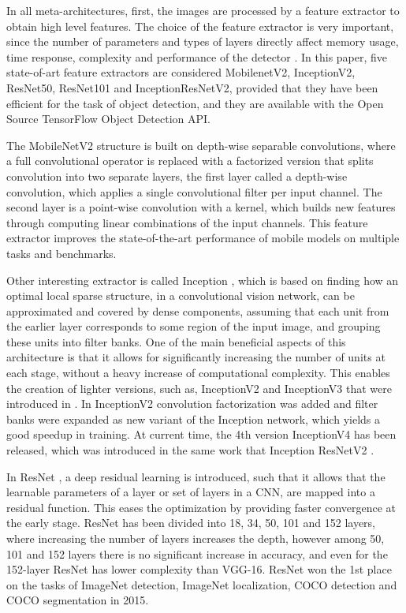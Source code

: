 \documentclass[journal]{IEEEtran}
\begin{document}
In all meta-architectures, first, the images are processed by a feature extractor to obtain high level features. The choice of the feature extractor is very important, since the number of parameters and types of layers directly affect memory usage, time response, complexity and performance of the detector \cite{huang2017speed}. In this paper, five state-of-art feature extractors are considered MobilenetV2, InceptionV2, ResNet50, ResNet101 and InceptionResNetV2, provided that they have been efficient for the task of object detection, and they are available with the Open Source TensorFlow Object Detection API. 

The MobileNetV2 \cite{sandler2018mobilenetv2} structure is built on depth-wise separable convolutions, where a full convolutional operator is replaced with a factorized version that splits convolution into two separate layers, the first layer called a depth-wise convolution, which applies a single convolutional filter per input channel. The second layer is a point-wise convolution with a  kernel, which builds new features through computing linear combinations of the input channels. This feature extractor improves the state-of-the-art performance of mobile models on multiple tasks and benchmarks.

Other interesting extractor is called Inception \cite{szegedy2015going}, which is based on finding how an optimal local sparse structure, in a convolutional vision network, can be approximated and covered by dense components, assuming that each unit from the earlier layer corresponds to some region of the input image, and grouping these units into filter banks. One of the main beneficial aspects of this architecture is that it allows for significantly increasing the number of units at each stage, without a heavy increase of computational complexity. This enables the creation of lighter versions, such as, InceptionV2 and InceptionV3 that were introduced in \cite{szegedy2016re}. In InceptionV2 convolution factorization was added and filter banks were expanded as new variant of the Inception network, which yields a good speedup in training. At current time, the 4th version InceptionV4 has been released, which was introduced in the same work that Inception ResNetV2 \cite{szegedy2017inception}.

In ResNet \cite{he2016deep}, a deep residual learning is introduced, such that it allows that the learnable parameters of a layer or set of layers in a CNN, are mapped into a residual function. This eases the optimization by providing faster convergence at the early stage. ResNet has been divided into 18, 34, 50, 101 and 152 layers, where increasing the number of layers increases the depth, however among 50, 101 and 152 layers there is no significant increase in accuracy, and even for the 152-layer ResNet has lower complexity than VGG-16. ResNet won the 1st place on the tasks of ImageNet detection, ImageNet localization, COCO detection and COCO segmentation in 2015.
\end{document}
